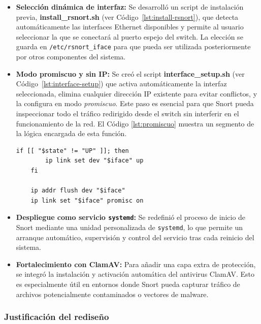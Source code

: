\documentclass[11pt,a4paper,twoside]{report}
\begin{document}
\begin{itemize}
	\item \textbf{Selección dinámica de interfaz:} Se desarrolló un script de instalación previa, \textbf{install\_rsnort.sh} (ver Código~\ref{lst:install-rsnort}), que detecta automáticamente las interfaces Ethernet disponibles y permite al usuario seleccionar la que se conectará al puerto espejo del switch. La elección se guarda en \texttt{/etc/rsnort\_iface} para que pueda ser utilizada posteriormente por otros componentes del sistema.
	
	\item \textbf{Modo promiscuo y sin IP:} Se creó el script \textbf{interface\_setup.sh} (ver Código~\ref{lst:interface-setup}) que activa automáticamente la interfaz seleccionada, elimina cualquier dirección IP existente para evitar conflictos, y la configura en modo \textit{promiscuo}. Este paso es esencial para que Snort pueda inspeccionar todo el tráfico redirigido desde el switch sin interferir en el funcionamiento de la red. El Código \ref{lst:promiscuo} muestra un segmento de la lógica encargada de esta función.
	
	\begin{lstlisting}[style=commandstyle, caption={Activación automática del modo promiscuo en interface\_setup.sh.}, label=lst:promiscuo]
	if [[ "$state" != "UP" ]]; then
		ip link set dev "$iface" up
	fi
	
	ip addr flush dev "$iface"
	ip link set "$iface" promisc on
	\end{lstlisting}
	
	\item \textbf{Despliegue como servicio \texttt{systemd}:} Se redefinió el proceso de inicio de Snort mediante una unidad personalizada de \texttt{systemd}, lo que permite un arranque automático, supervisión y control del servicio tras cada reinicio del sistema.
	
	\item \textbf{Fortalecimiento con ClamAV:} Para añadir una capa extra de protección, se integró la instalación y activación automática del antivirus ClamAV. Esto es especialmente útil en entornos donde Snort pueda capturar tráfico de archivos potencialmente contaminados o vectores de malware.
\end{itemize}

\subsubsection{Justificación del rediseño}
\end{document}
